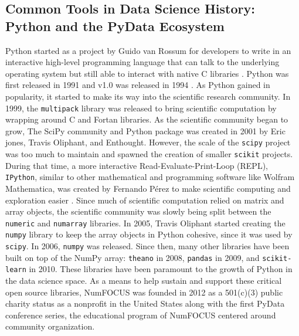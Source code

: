 \documentclass[010-intro.tex]{subfiles}
\begin{document}
    \subsection{Common Tools in Data Science History: Python and the PyData Ecosystem}

        Python started as a project by Guido van Rossum for developers to write in an interactive high-level programming language that can
        talk to the underlying operating system but still able to interact with native C libraries
        \cite{severanceGuidoVanRossum2005}.
        Python was first released in 1991 and v1.0 was released in 1994
        \cite{severanceGuidoVanRossum2005}.
        As Python gained in popularity, it started to make its way into the scientific research community.
        In 1999, the \lstinline{multipack} library was released to bring scientific computation by wrapping around C and Fortan libraries.
        As the scientific community began to grow,
        The SciPy community and Python package was created in 2001 by Eric jones, Travis Oliphant, and Enthought.
        However, the scale of the \lstinline{scipy} project was too much to maintain
        and spawned the creation of smaller \lstinline{scikit} projects.
        During that time,
        a more interactive Read-Evaluate-Print-Loop (REPL),
        \lstinline{IPython},
        similar to other mathematical and programming software like Wolfram Mathematica,
        was created by Fernando Pérez to make scientific computing and exploration easier
        \cite{iPythondevelopmentteamHistory}.
        Since much of scientific computation relied on matrix and array objects,
        the scientific community was slowly being split between the \lstinline{numeric} and \lstinline{numarray} libraries.
        In 2005, Travis Oliphant started creating the \lstinline{numpy} library to keep the array objects in Python cohesive,
        since it was used by \lstinline{scipy}.
        In 2006, \lstinline{numpy} was released.
        Since then, many other libraries have been built on top of the NumPy array:
        \lstinline{theano} in 2008, \lstinline{pandas} in 2009, and \lstinline{scikit-learn} in 2010.
        These libraries have been paramount to the growth of Python in the data science space. %
        As a means to help sustain and support these critical open source libraries,
        NumFOCUS was founded in 2012 as a 501(c)(3) public charity status as a nonprofit in the United States along with the first PyData
        conference series, the educational program of NumFOCUS centered around community organization.
\end{document}
